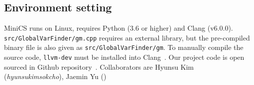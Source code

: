 \subsection{Environment setting}

MiniCS runs on Linux, requires Python (3.6 or higher) and Clang (v6.0.0). \verb|src/GlobalVarFinder/gm.cpp| requires an external library, but the pre-compiled binary file is also given as \verb|src/GlobalVarFinder/gm|. To manually compile the source code, \verb|llvm-dev| must be installed into Clang~\cite{clang}. Our project code is open sourced in Github repository~\cite{miniCS}. Collaborators are Hyunsu Kim (\textit{hyunsukimsokcho}), Jaemin Yu (\textit{})

